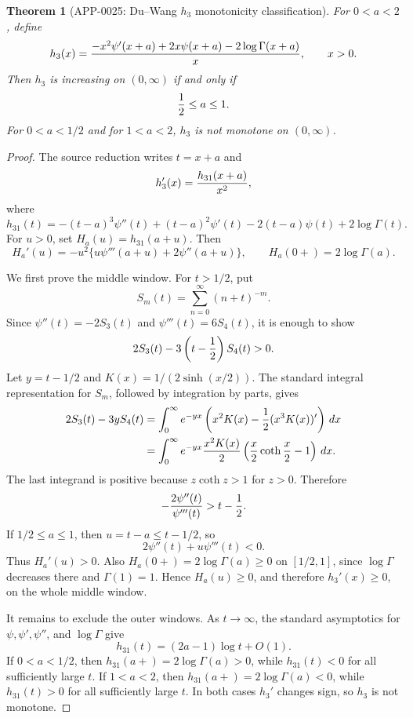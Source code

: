 \documentclass[11pt]{article}
\numberwithin{equation}{section}
\newtheorem{theorem}{Theorem}[section]
\theoremstyle{definition}
\theoremstyle{remark}
\newcommand{\1}{\mathbf 1}
\begin{document}
\begin{theorem}[APP-0025: Du--Wang \(h_3\) monotonicity classification]
\label{thm:app25-du-wang-h3}
For \(0<a<2\), define
\[
 h_3(x)=
 {-x^2\psi'(x+a)+2x\psi(x+a)-2\log\Gamma(x+a)\over x},
 \qquad x>0 .
\]
Then \(h_3\) is increasing on \((0,\infty)\) if and only if
\[
  {1\over2}\le a\le1 .
\]
For \(0<a<1/2\) and for \(1<a<2\), \(h_3\) is not monotone on
\((0,\infty)\).
\end{theorem}

\begin{proof}
The source reduction writes \(t=x+a\) and
\[
 h_3'(x)={h_{31}(x+a)\over x^2},
\]
where
\[
 h_{31}(t)=-(t-a)^3\psi''(t)+(t-a)^2\psi'(t)
          -2(t-a)\psi(t)+2\log\Gamma(t).
\]
For \(u>0\), set \(H_a(u)=h_{31}(a+u)\).  Then
\[
 H_a'(u)=-u^2\{u\psi'''(a+u)+2\psi''(a+u)\},
 \qquad
 H_a(0+)=2\log\Gamma(a).
\]

We first prove the middle window.  For \(t>1/2\), put
\[
 S_m(t)=\sum_{n=0}^\infty (n+t)^{-m}.
\]
Since \(\psi''(t)=-2S_3(t)\) and \(\psi'''(t)=6S_4(t)\), it is enough to show
\[
 2S_3(t)-3\left(t-{1\over2}\right)S_4(t)>0 .
\]
Let \(y=t-1/2\) and \(K(x)=1/(2\sinh(x/2))\).  The standard integral
representation for \(S_m\), followed by integration by parts, gives
\[
\begin{aligned}
 2S_3(t)-3yS_4(t)
 &=\int_0^\infty e^{-yx}
   \left(x^2K(x)-{1\over2}(x^3K(x))'\right)\,dx  \\
 &=\int_0^\infty e^{-yx}
   {x^2K(x)\over2}\left({x\over2}\coth{x\over2}-1\right)\,dx .
\end{aligned}
\]
The last integrand is positive because \(z\coth z>1\) for \(z>0\).  Therefore
\[
 -{2\psi''(t)\over\psi'''(t)}>t-{1\over2}.
\]
If \(1/2\le a\le1\), then \(u=t-a\le t-1/2\), so
\[
 2\psi''(t)+u\psi'''(t)<0 .
\]
Thus \(H_a'(u)>0\).  Also \(H_a(0+)=2\log\Gamma(a)\ge0\) on
\([1/2,1]\), since \(\log\Gamma\) decreases there and \(\Gamma(1)=1\).
Hence \(H_a(u)\ge0\), and therefore \(h_3'(x)\ge0\), on the whole middle
window.

It remains to exclude the outer windows.  As \(t\to\infty\), the standard
asymptotics for \(\psi,\psi',\psi''\), and \(\log\Gamma\) give
\[
  h_{31}(t)=(2a-1)\log t+O(1).
\]
If \(0<a<1/2\), then \(h_{31}(a+)=2\log\Gamma(a)>0\), while
\(h_{31}(t)<0\) for all sufficiently large \(t\).  If \(1<a<2\), then
\(h_{31}(a+)=2\log\Gamma(a)<0\), while \(h_{31}(t)>0\) for all sufficiently
large \(t\).  In both cases \(h_3'\) changes sign, so \(h_3\) is not monotone.
\end{proof}
\end{document}
